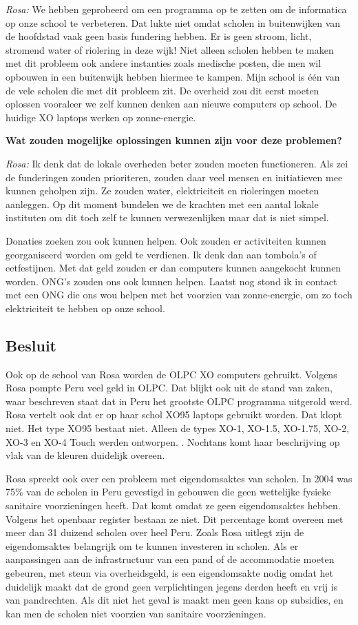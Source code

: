 \textit{Rosa:} We hebben geprobeerd om een programma op te zetten om de informatica op onze school te verbeteren. Dat lukte niet omdat scholen in buitenwijken van de hoofdstad vaak geen basis fundering hebben. Er is geen stroom, licht, stromend water of riolering in deze wijk! Niet alleen scholen hebben te maken met dit probleem ook andere instanties zoals medische posten, die men wil opbouwen in een buitenwijk hebben hiermee te kampen. Mijn school is één van de vele scholen die met dit probleem zit. De overheid zou dit eerst moeten oplossen vooraleer we zelf kunnen denken aan nieuwe computers op school. De huidige XO laptops werken op zonne-energie. 

\textbf{Wat zouden mogelijke oplossingen kunnen zijn voor deze problemen?}

\textit{Rosa:} Ik denk dat de lokale overheden beter zouden moeten functioneren. Als zei de funderingen zouden prioriteren, zouden daar veel mensen en initiatieven mee kunnen geholpen zijn. Ze zouden water, elektriciteit en rioleringen moeten aanleggen. Op dit moment bundelen we de krachten met een aantal lokale instituten om dit toch zelf te kunnen verwezenlijken maar dat is niet simpel. 

Donaties zoeken zou ook kunnen helpen. Ook zouden er activiteiten kunnen georganiseerd worden om geld te verdienen. Ik denk dan aan tombola's of eetfestijnen. Met dat geld zouden er dan computers kunnen aangekocht kunnen worden. ONG's zouden ons ook kunnen helpen. Laatst nog stond ik in contact met een ONG die ons wou helpen met het voorzien van zonne-energie, om zo toch elektriciteit te hebben op onze school.

\subsection{Besluit}
Ook op de school van Rosa worden de OLPC XO computers gebruikt. Volgens Rosa pompte Peru veel geld in OLPC. Dat blijkt ook uit de stand van zaken, waar beschreven staat dat in Peru het grootste OLPC programma uitgerold werd. Rosa vertelt ook dat er op haar schol XO95 laptops gebruikt worden. Dat klopt niet. Het type XO95 bestaat niet. Alleen de types XO-1, XO-1.5, XO-1.75, XO-2, XO-3 en XO-4 Touch werden ontworpen. \autocite{OLPC2016}. Nochtans komt haar beschrijving op vlak van de kleuren duidelijk overeen. 

Rosa spreekt ook over een probleem met eigendomsaktes van scholen. In 2004 was 75\% van de scholen in Peru gevestigd in gebouwen die geen wettelijke fysieke sanitaire voorzieningen heeft. Dat komt omdat ze geen eigendomsaktes hebben. Volgens het openbaar register bestaan ze niet. Dit percentage komt overeen met meer dan 31 duizend scholen over heel Peru. Zoals Rosa uitlegt zijn de eigendomsaktes belangrijk om te kunnen investeren in scholen. Als er aanpassingen aan de infrastructuur van een pand of de accommodatie moeten gebeuren, met steun via overheidsgeld, is een eigendomsakte nodig omdat het duidelijk maakt dat de grond geen verplichtingen jegens derden heeft en vrij is van pandrechten. Als dit niet het geval is maakt men geen kans op subsidies, en kan men de scholen niet voorzien van sanitaire voorzieningen.


